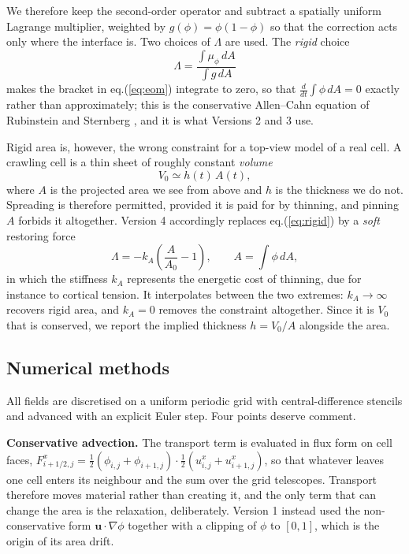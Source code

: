 \documentclass[11pt]{article}
\begin{document}
We therefore keep the second-order operator and subtract a spatially uniform
Lagrange multiplier, weighted by $g(\phi)=\phi(1-\phi)$ so that the correction
acts only where the interface is. Two choices of $\Lambda$ are used. The
\textit{rigid} choice
\begin{equation}\label{eq:rigid}
\Lambda=\frac{\int\mu_\phi\,dA}{\int g\,dA}
\end{equation}
makes the bracket in eq.(\ref{eq:eom}) integrate to zero, so that
$\frac{d}{dt}\int\phi\,dA=0$ exactly rather than approximately; this is the
conservative Allen--Cahn equation of Rubinstein and Sternberg
\cite{Rubinstein:1992}, and it is what Versions 2 and 3 use.

Rigid area is, however, the wrong constraint for a top-view model of a real cell.
A crawling cell is a thin sheet of roughly constant \textit{volume}
\begin{equation}\label{eq:volume}
V_{0}\simeq h(t)\,A(t),
\end{equation}
where $A$ is the projected area we see from above and $h$ is the thickness we do
not. Spreading is therefore permitted, provided it is paid for by thinning, and
pinning $A$ forbids it altogether. Version 4 accordingly replaces
eq.(\ref{eq:rigid}) by a \textit{soft} restoring force
\begin{equation}\label{eq:soft}
\Lambda=-k_{A}\left(\frac{A}{A_{0}}-1\right),
\qquad A=\int\phi\,dA,
\end{equation}
in which the stiffness $k_{A}$ represents the energetic cost of thinning, due for
instance to cortical tension. It interpolates between the two extremes:
$k_{A}\to\infty$ recovers rigid area, and $k_{A}=0$ removes the constraint
altogether. Since it is $V_{0}$ that is conserved, we report the implied
thickness $h=V_{0}/A$ alongside the area.

\noindent
\subsection{Numerical methods}
\label{subsec:numerics}

All fields are discretised on a uniform periodic grid with central-difference
stencils and advanced with an explicit Euler step. Four points deserve comment.

\textbf{Conservative advection.} The transport term is evaluated in flux form on
cell faces, $F^{x}_{i+1/2,j}=\frac{1}{2}(\phi_{i,j}+\phi_{i+1,j})\cdot
\frac{1}{2}(u^{x}_{i,j}+u^{x}_{i+1,j})$, so that whatever leaves one cell enters
its neighbour and the sum over the grid telescopes. Transport therefore moves
material rather than creating it, and the only term that can change the area is
the relaxation, deliberately. Version 1 instead used the non-conservative form
$\mathbf{u}\cdot\nabla\phi$ together with a clipping of $\phi$ to $[0,1]$, which
is the origin of its area drift.
\end{document}
